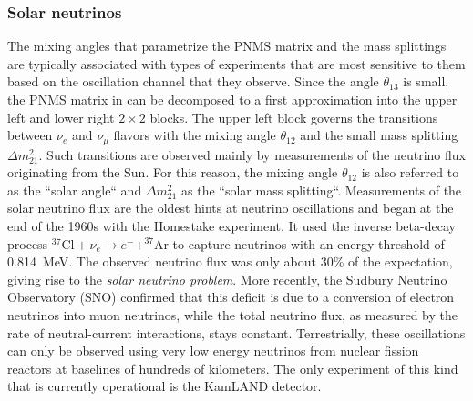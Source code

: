 \subsubsection{Solar neutrinos}
The mixing angles that parametrize the PNMS matrix and the mass splittings are typically associated with types of experiments that are most sensitive to them based on the oscillation channel that they observe. Since the angle $\theta_{13}$ is small, the PNMS matrix in  can be decomposed to a first approximation into the upper left and lower right $2\times2$ blocks. The upper left block governs the transitions between $\nu_e$ and $\nu_\mu$ flavors with the mixing angle $\theta_{12}$ and the small mass splitting $\Delta m^2_{21}$. Such transitions are observed mainly by measurements of the neutrino flux originating from the Sun. For this reason, the mixing angle $\theta_{12}$ is also referred to as the ``solar angle`` and $\Delta m^2_{21}$ as the ``solar mass splitting``. Measurements of the solar neutrino flux are the oldest hints at neutrino oscillations and began at the end of the 1960s with the Homestake\cite{DAVIS199413} experiment. It used the inverse beta-decay process $^{37}\mathrm{Cl}+\nu_e \rightarrow e^- + ^{37}\mathrm{Ar}$ to capture neutrinos with an energy threshold of \SI{0.814}{MeV}. The observed neutrino flux was only about 30\% of the expectation, giving rise to the \emph{solar neutrino problem}. More recently, the Sudbury Neutrino Observatory (SNO) confirmed\cite{PhysRevC.88.025501} that this deficit is due to a conversion of electron neutrinos into muon neutrinos, while the total neutrino flux, as measured by the rate of neutral-current interactions, stays constant. Terrestrially, these oscillations can only be observed using very low energy neutrinos from nuclear fission reactors at baselines of hundreds of kilometers. The only experiment of this kind that is currently operational is the KamLAND detector\cite{PhysRevLett.90.021802}.

